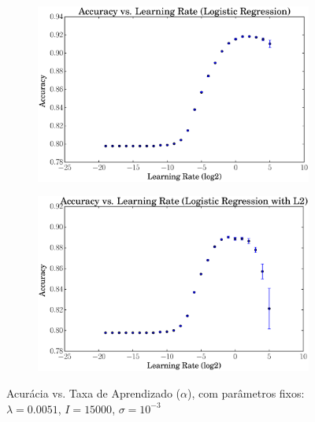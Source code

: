 \documentclass[a4paper, 12pt]{article}
\begin{document}
\begin{figure}[htpb]
\begin{subfigure}[htpb]{0.45\textwidth}
        \includegraphics[width=\textwidth]{acc_vs_rate_logreg}
        \caption{}
        \label{fig:rate_logreg}
    \end{subfigure}
    \begin{subfigure}[htpb]{0.45\textwidth}
        \includegraphics[width=\textwidth]{acc_vs_rate_logregL2}
        \caption{}
        \label{fig:rate_logregL2}
    \end{subfigure}
    \caption{Acurácia vs. Taxa de Aprendizado ($\alpha$), com parâmetros
    fixos: $\lambda=0.0051$, $I=15000$, $\sigma=10^{-3}$}\label{fig:rate}
\end{figure}
\end{document}
